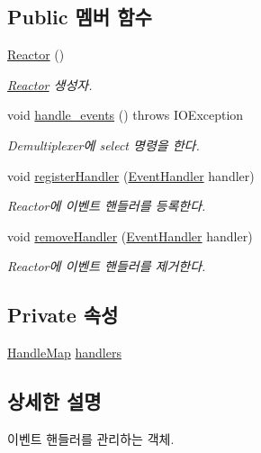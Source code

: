 \subsection*{Public 멤버 함수}
\begin{DoxyCompactItemize}
\item 
\hyperlink{classserver_1_1_reactor_ad32bfcaec7e42dfd6aab98c462af98cf}{Reactor} ()
\begin{DoxyCompactList}\small\item\em \hyperlink{classserver_1_1_reactor}{Reactor} 생성자. \end{DoxyCompactList}\item 
void \hyperlink{classserver_1_1_reactor_a6049200905b17b4aba0de79b6df0f5d2}{handle\-\_\-events} ()  throws I\-O\-Exception 
\begin{DoxyCompactList}\small\item\em Demultiplexer에 select 명령을 한다. \end{DoxyCompactList}\item 
void \hyperlink{classserver_1_1_reactor_a3e668edae20fadfc4063a83a74001fda}{register\-Handler} (\hyperlink{interfaceserver_1_1event__handler_1_1_event_handler}{Event\-Handler} handler)
\begin{DoxyCompactList}\small\item\em Reactor에 이벤트 핸들러를 등록한다. \end{DoxyCompactList}\item 
void \hyperlink{classserver_1_1_reactor_a936c855c6581047687a117c0ee76a296}{remove\-Handler} (\hyperlink{interfaceserver_1_1event__handler_1_1_event_handler}{Event\-Handler} handler)
\begin{DoxyCompactList}\small\item\em Reactor에 이벤트 핸들러를 제거한다. \end{DoxyCompactList}\end{DoxyCompactItemize}
\subsection*{Private 속성}
\begin{DoxyCompactItemize}
\item 
\hyperlink{classserver_1_1_handle_map}{Handle\-Map} \hyperlink{classserver_1_1_reactor_a68f3383c5eb092e372bcf4f39015334f}{handlers}
\end{DoxyCompactItemize}


\subsection{상세한 설명}
이벤트 핸들러를 관리하는 객체. 

